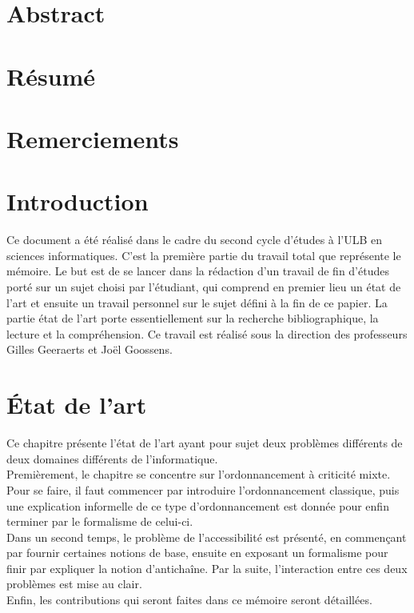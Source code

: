 \documentclass[11pt,a4paper,oneside]{book}
\theoremstyle{break}
\theoremstyle{breakplain}
\begin{document}
\newpage
\thispagestyle{empty} 
\null



\frontmatter



\chapter*{Abstract}

\chapter*{Résumé}

\chapter*{Remerciements}

\tableofcontents


\mainmatter


\chapter{Introduction}
Ce document a été réalisé dans le cadre du second cycle d'études à l'ULB en sciences informatiques. C'est la première partie du travail total que représente le mémoire. Le but est de se lancer dans la rédaction d'un travail de fin d'études porté sur un sujet choisi par l'étudiant, qui comprend en premier lieu un état de l'art et ensuite un travail personnel sur le sujet défini à la fin de ce papier. La partie état de l'art porte essentiellement sur la recherche bibliographique, la lecture et la compréhension. Ce travail est réalisé sous la direction des professeurs Gilles Geeraerts et Joël Goossens.


\chapter{État de l'art}

Ce chapitre présente l'état de l'art ayant pour sujet deux problèmes différents de deux domaines différents de l'informatique.\\
Premièrement, le chapitre se concentre sur l'ordonnancement à criticité mixte. Pour se faire, il faut commencer par introduire l'ordonnancement classique, puis une explication informelle de ce type d'ordonnancement est donnée pour enfin terminer par le formalisme de celui-ci.\\
Dans un second temps, le problème de l'accessibilité est présenté, en commençant par fournir certaines notions de base, ensuite en exposant un formalisme pour finir par expliquer la notion d'antichaîne. Par la suite, l'interaction entre ces deux problèmes est mise au clair.\\
Enfin, les contributions qui seront faites dans ce mémoire seront détaillées.
\end{document}
